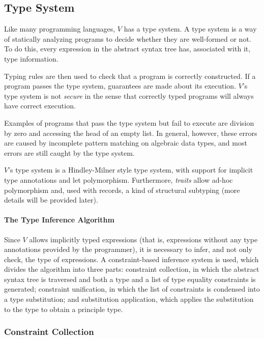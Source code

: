 \documentclass[class=article, crop=false]{standalone}
\begin{document}
\subsection{Type System}\label{Type System}

Like many programming languages, $V$ has a type system.
A type system is a way of statically analyzing programs to decide whether they are well-formed or not.
To do this, every expression in the abstract syntax tree has, associated with it, type information.

Typing rules are then used to check that a program is correctly constructed.
If a program passes the type system, guarantees are made about its execution.
$V$'s type system is not \emph{secure} in the sense that correctly typed programs will always have correct execution.

Examples of programs that pass the type system but fail to execute are division by zero and accessing the head of an empty list.
In general, however, these errors are caused by incomplete pattern matching on algebraic data types, and most errors are still caught by the type system.

\smallskip

$V$'s type system is a Hindley\hyp Milner style type system, with support for implicit type annotations and let polymorphism.
Furthermore, \emph{traits} allow ad-hoc polymorphism and, used with records, a kind of structural subtyping (more details will be provided later).

\paragraph{The Type Inference Algorithm}

Since $V$ allows implicitly typed expressions (that is, expressions without any type annotations provided by the programmer), it is necessary to infer, and not only check, the type of expressions.
A constraint-based inference system is used, which divides the algorithm into three parts: constraint collection, in which the abstract syntax tree is traversed and both a type and a list of type equality constraints is generated; constraint unification, in which the list of constraints is condensed into a type substitution; and substitution application, which applies the substitution to the type to obtain a principle type.

\subsubsection{Constraint Collection}
\end{document}
